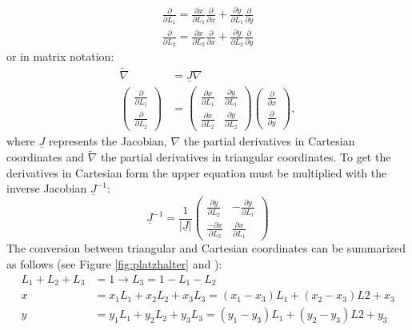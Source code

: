   \begin{align}
  \frac{\partial}{\partial L_1} = \frac{\partial x}{\partial L_1} \frac{\partial}{\partial x} + \frac{\partial y}{\partial L_1} \frac{\partial}{\partial y} \nonumber\\
  \frac{\partial}{\partial L_2} = \frac{\partial x}{\partial L_2} \frac{\partial}{\partial x} + \frac{\partial y}{\partial L_2} \frac{\partial}{\partial y}
  \end{align}
  or in matrix notation:
  \begin{align}\label{eq:t3NablaTilde}
  \tilde{\nabla} &= \underline{J} \nabla \nonumber\\
  \begin{pmatrix}
  \frac{\partial}{\partial L_1}\\ \frac{\partial}{\partial L_2}
  \end{pmatrix} &= \begin{pmatrix}
  \frac{\partial x}{\partial L_1} & \frac{\partial y}{\partial L_1}\\
  \frac{\partial x}{\partial L_2} & \frac{\partial y}{\partial L_2}
  \end{pmatrix} \begin{pmatrix}
  \frac{\partial}{\partial x}\\ \frac{\partial}{\partial y}
  \end{pmatrix},
  \end{align}
  where $\underline{J}$ represents the Jacobian, $\nabla$ the partial derivatives in Cartesian coordinates and $\tilde{\nabla}$ the partial derivatives in triangular coordinates. To get the derivatives in Cartesian form the upper equation must be multiplied with the inverse Jacobian $\underline{J}^{-1}$:
  \begin{equation}
  \underline{J}^{-1} = \frac{1}{|\underline{J}|} \begin{pmatrix}
  \frac{\partial y}{\partial L_2} & -\frac{\partial y}{\partial L_1} \\
  \frac{-\partial x}{\partial L_2} & \frac{\partial x}{\partial L_1}
  \end{pmatrix}
  \end{equation}
  The conversion between triangular and Cartesian coordinates can be summarized as follows (see Figure \ref{fig:platzhalter} and \cite{steinke2005finite}):
  \begin{align}\label{eq:triCoord<->CartCoord}
  L_1 + L_2 + L_3 &= 1 \rightarrow L_3 = 1-L_1-L_2 \nonumber\\
  x &= x_1L_1 + x_2L_2 + x_3L_3 = (x_1-x_3)L_1 + (x_2-x_3)L2 + x_3\\
  y &= y_1L_1 + y_2L_2 + y_3L_3 = (y_1-y_3)L_1 + (y_2-y_3)L2 + y_3 \nonumber
  \end{align}
